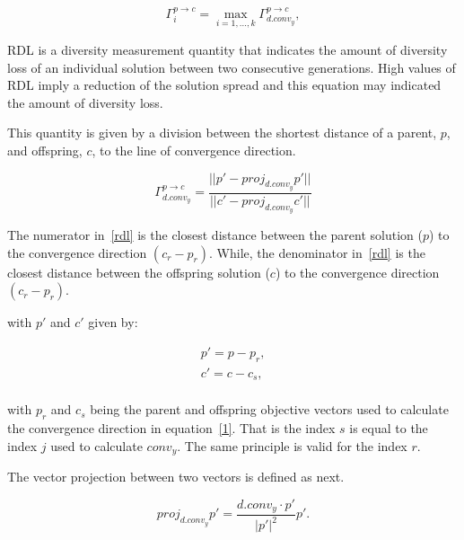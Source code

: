 \begin{equation}
\Gamma_{i}^{p \rightarrow c} = \underset{i=1,...,k}{\max} \Gamma_{d.conv_{y}}^{p \rightarrow c},
\end{equation}




RDL is a diversity measurement quantity that indicates the amount of diversity loss of an individual solution between two consecutive generations. High values of RDL imply a reduction of the solution spread and this equation may indicated the amount of diversity loss.

This quantity is given by a division between the shortest distance of a parent, $p$,  and offspring, $c$, to the line of convergence direction.

\begin{equation}
\label{rdl}
\Gamma_{d.conv_{y}}^{p \rightarrow c} = \dfrac{ ||p \prime - proj_{d.conv_{y}}p \prime|| }{||c \prime - proj_{d.conv_{y}}c \prime||}
\end{equation}

The numerator in~\ref{rdl} is the closest distance between the parent solution ($p$) to the convergence direction $(c_r - p_r)$. While, the denominator in~\ref{rdl} is the closest distance between the offspring solution ($c$) to the convergence direction $(c_r - p_r)$. %

with $p\prime$ and $c\prime $ given by:

\begin{equation}
\begin{split}
p\prime = p - p_r,\\
c\prime = c - c_s,\\
\end{split}
\end{equation}

with $p_r$ and $c_s$ being the parent and offspring objective vectors used to calculate the convergence direction in equation~\ref{1}. That is the index $s$ is equal to the index $j$ used to calculate $conv_{y}$. The same principle is valid for the index $r$.
 
The vector projection between two vectors is defined as next.

\begin{equation}
proj_{d.conv_{y}}p \prime = \frac {{d.conv_{y}} \cdot {p \prime}} {|{p \prime}|^2}{{p \prime}}.
\end{equation}

